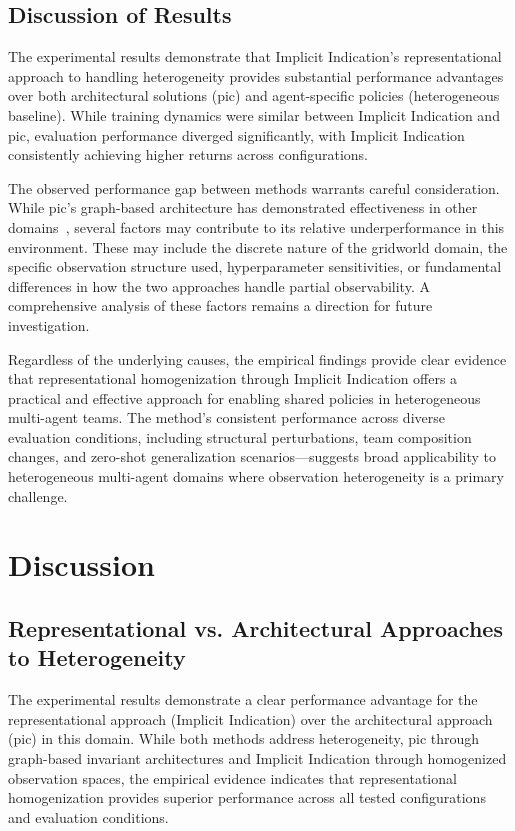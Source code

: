 \subsection{Discussion of Results}

The experimental results demonstrate that Implicit Indication's 
representational approach to handling heterogeneity provides 
substantial performance advantages over both architectural 
solutions (\gls{pic}) and agent-specific policies (heterogeneous baseline). 
While training dynamics were similar between Implicit Indication and \gls{pic}, 
evaluation performance diverged significantly, with Implicit Indication 
consistently achieving higher returns across configurations.

The observed performance gap between methods warrants careful consideration. 
While \gls{pic}'s graph-based architecture has demonstrated effectiveness in 
other domains~\cite{liu2020b}, several factors may contribute to its relative 
underperformance in this environment. 
These may include the discrete nature of the gridworld domain, 
the specific observation structure used, hyperparameter sensitivities, 
or fundamental differences in how the two approaches handle partial observability. 
A comprehensive analysis of these factors remains a direction for future investigation.

Regardless of the underlying causes, the empirical findings provide clear evidence 
that representational homogenization through Implicit Indication offers a practical 
and effective approach for enabling shared policies in heterogeneous multi-agent teams. 
The method's consistent performance across diverse evaluation conditions, 
including structural perturbations, team composition changes, 
and zero-shot generalization scenarios—suggests broad applicability to 
heterogeneous multi-agent domains where observation heterogeneity is a primary challenge.

\section{Discussion}

\subsection{Representational vs. Architectural Approaches to Heterogeneity}

The experimental results demonstrate a clear performance advantage for 
the representational approach (Implicit Indication) over the architectural 
approach (\gls{pic}) in this domain. While both methods address heterogeneity, 
\gls{pic} through graph-based invariant architectures and Implicit Indication 
through homogenized observation spaces, the empirical evidence indicates that 
representational homogenization provides superior performance across all 
tested configurations and evaluation conditions.

